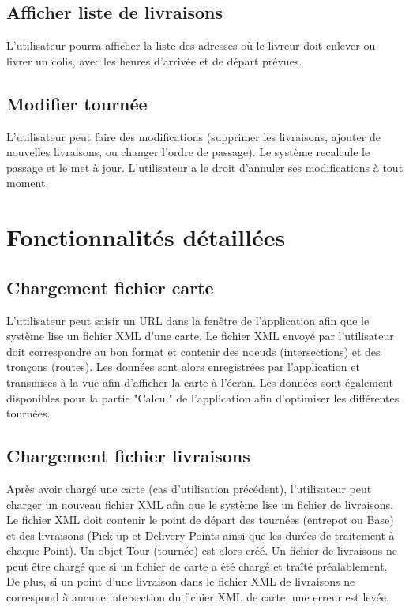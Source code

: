 \documentclass{scrartcl}
\begin{document}
\subsection{Afficher liste de livraisons}
L'utilisateur pourra afficher la liste des adresses où le livreur doit enlever ou livrer un colis, avec les heures d'arrivée et de départ prévues.

\subsection{Modifier tournée}
L'utilisateur peut faire des modifications (supprimer les livraisons, ajouter de nouvelles livraisons, ou changer l'ordre de passage). Le système recalcule le passage et le met à jour. L'utilisateur a le droit d'annuler ses modifications à tout moment.


\newpage
\section{Fonctionnalités détaillées}
\subsection{Chargement fichier carte}
L'utilisateur peut saisir un URL dans la fenêtre de l'application afin que le système lise un fichier XML d'une carte. Le fichier XML envoyé par l'utilisateur doit correspondre au bon format et contenir des noeuds (intersections) et des tronçons (routes). Les données sont alors enregistrées par l'application et transmises à la vue afin d'afficher la carte à l'écran. Les données sont également disponibles pour la partie "Calcul" de l'application afin d'optimiser les différentes tournées.

\subsection{Chargement fichier livraisons}
Après avoir chargé une carte (cas d'utilisation précédent), l'utilisateur peut charger un nouveau fichier XML afin que le système lise un fichier de livraisons. Le fichier XML doit contenir le point de départ des tournées (entrepot ou Base) et des livraisons (Pick up et Delivery Points ainsi que les durées de traitement à chaque Point). Un objet Tour (tournée) est alors créé. Un fichier de livraisons ne peut être chargé que si un fichier de carte a été chargé et traîté préalablement. De plus, si un point d'une livraison dans le fichier XML de livraisons ne correspond à aucune intersection du fichier XML de carte, une erreur est levée.
\end{document}
